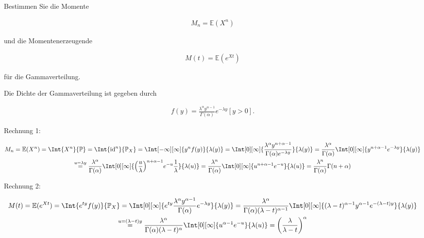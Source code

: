 \begin{exercise}

Bestimmen Sie die Momente

\begin{align*}
  M_n = \mathbb{E}(X^n)
\end{align*}

und die Momentenerzeugende

\begin{align*}
  M(t) = \mathbb{E}(e^{Xt})
\end{align*}

für die Gammaverteilung.

\end{exercise}

\begin{solution}

Die Dichte der Gammaverteilung ist gegeben durch

\begin{align*}
  f(y) =
  \frac
  {
    \lambda^\alpha
    y^{\alpha - 1}
  }{
    \Gamma(\alpha)
  }
  e^{-\lambda y}
  [y > 0].
\end{align*}

Rechnung 1:

\begin{multline*}
  M_n
  = \E(X^n)
  = \Int{X^n}{\P}
  = \Int{\id^n}{\P_X}
  = \Int[-\infty][\infty]{y^n f(y)}{\lambda(y)}
  = \Int[0][\infty]
  {
    \frac
    {\lambda^\alpha y^{n + \alpha - 1}}
    {
      \Gamma(\alpha)
      e^{-\lambda y}
    }
  }{\lambda(y)}
  = \frac
    {\lambda^\alpha}
    {\Gamma(\alpha)}
    \Int[0][\infty]
    {
      y^{n + \alpha - 1}
      e^{-\lambda y}
    }
    {\lambda(y)} \\
  \stackrel{u = \lambda y}{=}
    \frac
    {\lambda^\alpha}
    {\Gamma(\alpha)}
    \Int[0][\infty]
    {
      \pbraces{\frac{u}{\lambda}}^{n + \alpha - 1}
      e^{-u}
      \frac{1}{\lambda}
    }
    {\lambda(u)}
  = \frac{\lambda^n}{\Gamma(\alpha)}
    \Int[0][\infty]{u^{n + \alpha - 1} e^{-u}}{\lambda(u)}
  = \frac
    {\lambda^n}
    {\Gamma(\alpha)}
    \Gamma(n + \alpha)
\end{multline*}

Rechnung 2:

\begin{multline*}
  M(t)
  = \E(e^{Xt})
  = \Int{e^{ty} f(y)}{\P_X}
  = \Int[0][\infty]
    {
      e^{ty}
      \frac
      {\lambda^\alpha y^{\alpha -1}}
      {\Gamma(\alpha)}
      e^{-\lambda y}
    }
    {\lambda(y)}
  = \frac
    {\lambda^\alpha}
    {
      \Gamma(\alpha)
      (\lambda - t)^{\alpha - 1}
    }
    \Int[0][\infty]
    {
      (\lambda - t)^{\alpha - 1}
      y^{\alpha - 1}
      e^{-(\lambda - t) y}
    }
    {\lambda(y)} \\
  \stackrel{u = (\lambda - t) y}{=}
    \frac
    {\lambda^\alpha}
    {
      \Gamma(\alpha)
      (\lambda - t)^\alpha
    }
    \Int[0][\infty]
    {
      u^{\alpha - 1}
      e^{-u}
    }
    {\lambda(u)}
  = \pbraces
    {
      \frac
      {\lambda}
      {\lambda-t}
    }^\alpha
\end{multline*}

\end{solution}
